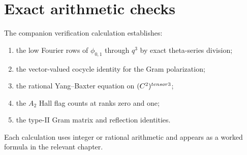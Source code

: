 \chapter{Exact arithmetic checks}
The companion verification calculation establishes:
\begin{enumerate}
\item the low Fourier rows of $\phi_{0,1}$ through $q^3$ by exact theta-series division;
\item the vector-valued cocycle identity for the Gram polarization;
\item the rational Yang--Baxter equation on $(C^2)^{tensor3}$;
\item the $A_2$ Hall flag counts at ranks zero and one;
\item the type-II Gram matrix and reflection identities.
\end{enumerate}
Each calculation uses integer or rational arithmetic and appears as a worked formula in the relevant chapter.

